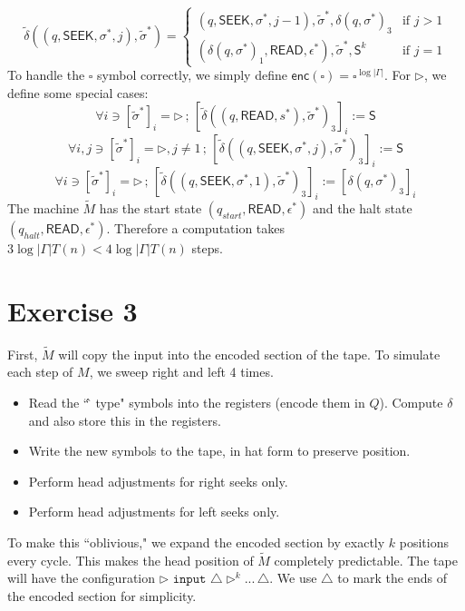 \documentclass[12pt]{article}
\begin{document}
$$
\tilde{\delta}
((q, \textsf{SEEK}, \sigma^*, j), \tilde{\sigma}^*) =
\begin{cases}
(q, \textsf{SEEK}, \sigma^*, j-1),  \tilde{\sigma}^*, \delta(q,\sigma^*)_3 &
\text{if } j > 1 \\
(\delta(q,\sigma^*)_1, \textsf{READ}, \epsilon^*), \tilde{\sigma}^*, \textsf{S}^k &
\text{if } j = 1
\end{cases}
$$
To handle the $\square$ symbol correctly, we simply define $\textsf{enc}(\square) = \square^{\log|\Gamma|}$. For $\triangleright$, we define some special cases:
$$
\forall i \ni [\tilde{\sigma}^*]_i = \triangleright 
\,;\,
[\tilde{\delta}((q, \textsf{READ}, s^*), \tilde{\sigma}^*)_3]_i := \textsf{S}
$$
$$
\forall i, j \ni [\tilde{\sigma}^*]_i = \triangleright, j \neq 1 
\,;\,
[\tilde{\delta}((q, \textsf{SEEK}, \sigma^*, j), \tilde{\sigma}^*)_3]_i := \textsf{S}
$$
$$
\forall i \ni [\tilde{\sigma}^*]_i = \triangleright  
\,;\,
[\tilde{\delta}((q, \textsf{SEEK}, \sigma^*, 1), \tilde{\sigma}^*)_3]_i := [\delta(q, \sigma^*)_3]_i
$$
The machine $\tilde{M}$ has the start state $(q_{start}, \textsf{READ}, \epsilon^*)$ and the halt state $(q_{halt}, \textsf{READ}, \epsilon^*)$. Therefore a computation takes $3\log|\Gamma|T(n) < 4\log|\Gamma|T(n)$ steps.

\section*{Exercise 3}


First, $\tilde{M}$ will copy the input into the encoded section of the tape. To simulate each step of $M$, we sweep right and left 4 times.
\begin{itemize}
\item{Read the ``\^\, type" symbols into the registers (encode them in $Q$). Compute $\delta$ and also store this in the registers.}
\item{Write the new symbols to the tape, in hat form to preserve position.}
\item{Perform head adjustments for right seeks only.}
\item{Perform head adjustments for left seeks only.}
\end{itemize}
To make this ``oblivious," we expand the encoded section by exactly $k$ positions every cycle. This makes the head position of $\tilde{M}$ completely predictable. The tape will have the configuration $\triangleright \texttt{ input } \triangle \triangleright^k ...\, \triangle$. We use $\triangle$ to mark the ends of the encoded section for simplicity. 
\end{document}
